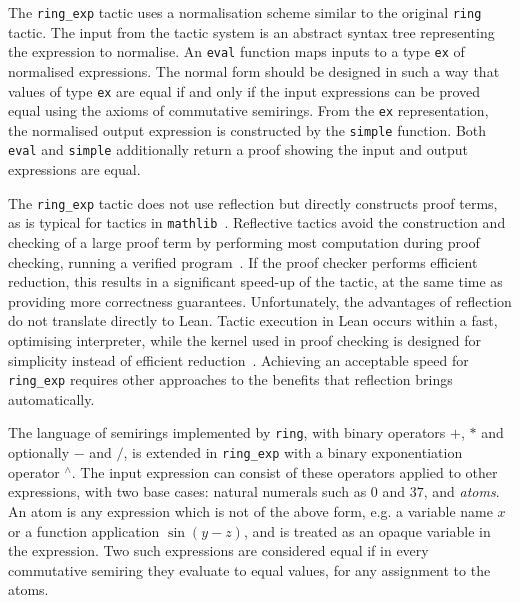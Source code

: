 \documentclass{llncs}
\newcommand{\lean}[1]{\texttt{#1}\xspace} %
\newcommand{\mathlib}{\texttt{mathlib}\xspace}
\newcommand{\pow}{{${}^\wedge$}\xspace}
\newcommand{\ring}{\lean{ring}}
\newcommand{\ringexp}{\lean{ring\_exp}}
\begin{document}
The \ringexp tactic uses a normalisation scheme similar to the original \ring tactic.
The input from the tactic system is an abstract syntax tree representing the expression to normalise.
An \lean{eval} function maps inputs to a type \lean{ex} of normalised expressions.
The normal form should be designed in such a way that values of type \lean{ex} are equal
if and only if the input expressions can be proved equal using the axioms of commutative semirings.
From the \lean{ex} representation, the normalised output expression is constructed by the \lean{simple} function.
Both \lean{eval} and \lean{simple} additionally return a proof showing the input and output expressions are equal.

The \ringexp tactic does not use reflection but directly constructs proof terms,
as is typical for tactics in \mathlib~\cite{mathlib}.
Reflective tactics avoid the construction and checking of a large proof term
by performing most computation during proof checking, running a verified program~\cite{reflection-tactics}.
If the proof checker performs efficient reduction, this results in a significant speed-up of the tactic,
at the same time as providing more correctness guarantees.
Unfortunately, the advantages of reflection do not translate directly to Lean.
Tactic execution in Lean occurs within a fast, optimising interpreter,
while the kernel used in proof checking is designed for simplicity instead of efficient reduction~\cite{lean-tactics}.
Achieving an acceptable speed for \ringexp requires other approaches to the benefits that reflection brings automatically.

The language of semirings implemented by \ring, with binary operators $+$, $*$ and optionally $-$ and $/$,
is extended in \ringexp with a binary exponentiation operator \pow.
The input expression can consist of these operators applied to other expressions,
with two base cases: natural numerals such as $0$ and $37$, and \emph{atoms}.
An atom is any expression which is not of the above form, e.g. a variable name $x$ or a function application $\sin (y - z)$,
and is treated as an opaque variable in the expression.
Two such expressions are considered equal if in every commutative semiring they evaluate to equal values, for any assignment to the atoms.
\end{document}
